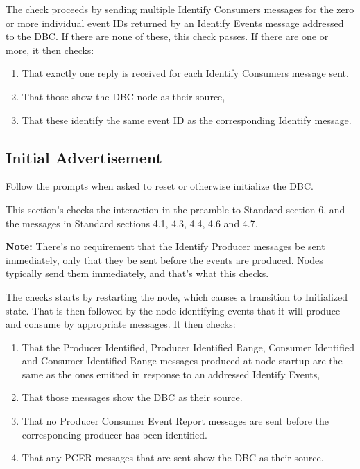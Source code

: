 \documentclass[11pt]{article}
\begin{document}
The check proceeds by sending multiple Identify Consumers messages for 
the zero or more individual event IDs returned by an Identify Events message 
addressed to the DBC. If there are none of these, this check passes. If there
are one or more, it then checks:

\begin{enumerate}
\item That exactly one reply is received for each Identify Consumers message sent.
\item That those show the DBC node as their source,
\item That these identify the same event ID as the corresponding Identify message.
\end{enumerate}

\subsection{Initial Advertisement}

Follow the prompts when asked to reset or otherwise initialize the DBC.

This section's checks the interaction in the preamble to Standard section 6, and
the messages in Standard sections 4.1, 4.3, 4.4, 4.6 and 4.7.

\textbf{Note:}  There's no requirement that the Identify Producer messages
be sent immediately, only that they be sent before the events are produced.
Nodes typically send them immediately, and that's what this checks.

The checks starts by restarting the node, which causes a transition to Initialized
state.  That is then followed by the node identifying events that it will 
produce and consume by appropriate messages. It then checks:

\begin{enumerate}
\item That the Producer Identified, Producer Identified Range, Consumer Identified 
    and Consumer Identified Range messages produced at node startup are the same
    as the ones emitted in response to an addressed Identify Events,
\item That those messages show the DBC as their source.
\item That no Producer Consumer Event Report messages are sent before the 
    corresponding producer has been identified.
\item That any PCER messages that are sent show the DBC as their source.
\end{enumerate}
\end{document}
